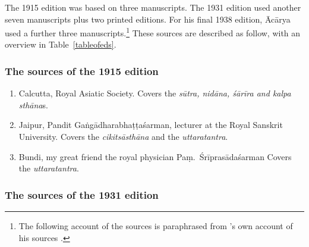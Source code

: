 The 1915 edition was based on three manuscripts.  The 1931 edition used another
seven manuscripts plus two printed editions.  For his final 1938 edition, Ācārya
used a further three manuscripts.\footnote{The following account of the sources is
paraphrased from \citeauthor{vulgate}'s own account of his sources
\citep[22]{vulgate}.}  These sources are described as follow, with an overview in
Table~\ref{tableofeds}.

\subsubsection{The sources of the 1915 edition}

\begin{enumerate}
    \item[1] Calcutta, Royal Asiatic Society.  Covers the \emph{sūtra, nidāna, śārīra 
    and 
        kalpa sthāna}s.  
    
    \item [2] Jaipur, Pandit Gaṅgādharabhaṭṭaśarman, lecturer at the Royal 
    Sanskrit University.  Covers the \emph{cikitsāsthāna} and the 
    \emph{uttaratantra}.
    
    \item [3]  Bundi, my great friend the royal physician Paṃ.\ Śrīprasādaśarman  
    Covers the \emph{uttaratantra}.
\end{enumerate}

\subsubsection{The sources of the 1931 edition}

